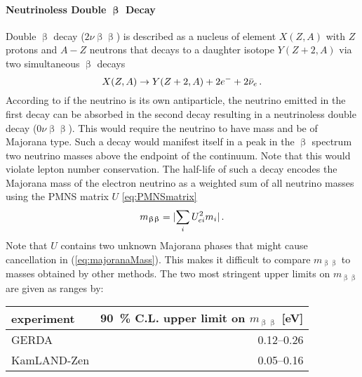 \paragraph{Neutrinoless Double $\boldsymbol{\upbeta}$ Decay}
Double $\upbeta$ decay ($2\nu\upbeta\upbeta$) is described as a nucleus of element $X(Z,A)$ with $Z$ protons and $A-Z$ neutrons that decays to a daughter isotope $Y(Z+2,A)$ via two simultaneous $\upbeta$ decays 
\begin{equation}
    X(Z,A) \rightarrow Y(Z+2,A) + 2e^- + 2\bar{\nu}_e \text{\,.}
\end{equation}
According to \cite{zuber2011neutrino} if the neutrino is its own antiparticle, the neutrino emitted in the first decay can be absorbed in the second decay resulting in a neutrinoless double decay ($0\nu\upbeta\upbeta$). This would require the neutrino to have mass and be of Majorana type. Such a decay would manifest itself in a peak in the $\upbeta$ spectrum two neutrino masses above the endpoint of the continuum. Note that this would violate lepton number conservation. The half-life of such a decay encodes the Majorana mass of the electron neutrino as a weighted sum of all neutrino masses using the PMNS matrix $U$ \eqref{eq:PMNSmatrix}
\begin{equation}
    \label{eq:majoranaMass}
    m_{\upbeta\upbeta} = \lvert\sum_i U_{ei}^2 m_i\rvert \text{\,.}
\end{equation}
Note that $U$ contains two unknown Majorana phases that might cause cancellation in (\ref{eq:majoranaMass}). This makes it difficult to compare $m_{\upbeta\upbeta}$ to masses obtained by other methods. The two most stringent upper limits on $m_{\upbeta\upbeta}$ are given as ranges by:
\begin{center}
\begin{tabular}{lr}
    \toprule
    experiment & \SI{90}{\percent} C.L. upper limit on $m_{\upbeta\upbeta}$ [eV]\\
    \hline
    GERDA \cite{Agostini2018} &  0.12–0.26 \\
    KamLAND-Zen \cite{Gando2016} & 0.05–0.16 \\
    \bottomrule
\end{tabular}
\end{center}

